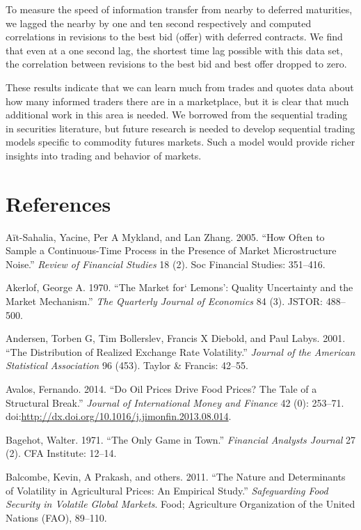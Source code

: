 \documentclass[]{elsarticle} %
\begin{document}
To measure the speed of information transfer from nearby to deferred
maturities, we lagged the nearby by one and ten second respectively and
computed correlations in revisions to the best bid (offer) with deferred
contracts. We find that even at a one second lag, the shortest time lag
possible with this data set, the correlation between revisions to the
best bid and best offer dropped to zero.

These results indicate that we can learn much from trades and quotes
data about how many informed traders there are in a marketplace, but it
is clear that much additional work in this area is needed. We borrowed
from the sequential trading in securities literature, but future
research is needed to develop sequential trading models specific to
commodity futures markets. Such a model would provide richer insights
into trading and behavior of markets.

\section*{References}\label{references}

A{ï}t-Sahalia, Yacine, Per A Mykland, and Lan Zhang. 2005. ``How Often
to Sample a Continuous-Time Process in the Presence of Market
Microstructure Noise.'' \emph{Review of Financial Studies} 18 (2). Soc
Financial Studies: 351--416.

Akerlof, George A. 1970. ``The Market for` Lemons': Quality Uncertainty
and the Market Mechanism.'' \emph{The Quarterly Journal of Economics} 84
(3). JSTOR: 488--500.

Andersen, Torben G, Tim Bollerslev, Francis X Diebold, and Paul Labys.
2001. ``The Distribution of Realized Exchange Rate Volatility.''
\emph{Journal of the American Statistical Association} 96 (453). Taylor
\& Francis: 42--55.

Avalos, Fernando. 2014. ``Do Oil Prices Drive Food Prices? The Tale of a
Structural Break.'' \emph{Journal of International Money and Finance} 42
(0): 253--71.
doi:\href{http://dx.doi.org/http://dx.doi.org/10.1016/j.jimonfin.2013.08.014}{http://dx.doi.org/10.1016/j.jimonfin.2013.08.014}.

Bagehot, Walter. 1971. ``The Only Game in Town.'' \emph{Financial
Analysts Journal} 27 (2). CFA Institute: 12--14.

Balcombe, Kevin, A Prakash, and others. 2011. ``The Nature and
Determinants of Volatility in Agricultural Prices: An Empirical Study.''
\emph{Safeguarding Food Security in Volatile Global Markets}. Food;
Agriculture Organization of the United Nations (FAO), 89--110.
\end{document}
